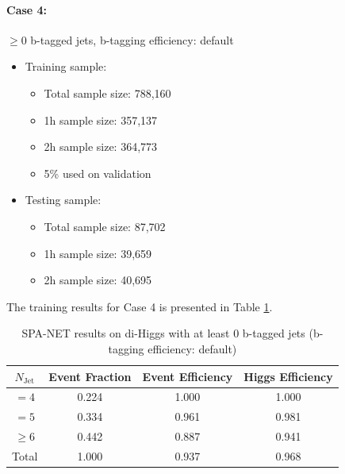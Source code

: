 \documentclass[12pt]{article}
\begin{document}
		\paragraph{Case 4:}$\ge 0$ b-tagged jets, b-tagging efficiency: default 
		\begin{itemize}
			\item Training sample:
			\begin{itemize}
				\item Total sample size: 788,160
				\item 1h sample size: 357,137
				\item 2h sample size: 364,773
				\item 5\% used on validation
			\end{itemize}
			\item Testing sample: 
				\begin{itemize}
					\item Total sample size: 87,702
					\item 1h sample size: 39,659
					\item 2h sample size: 40,695
				\end{itemize}
		\end{itemize}
		The training results for Case 4 is presented in Table \ref{tab:SPANet_0btag_default}.
		\begin{table}[htpb]
			\centering
			\caption{SPA-NET results on di-Higgs with at least 0 b-tagged jets (b-tagging efficiency: default)}
			\label{tab:SPANet_0btag_default}
			\begin{tabular}{c|c|cc}
				$N_\text{Jet}$ & Event Fraction & Event Efficiency & Higgs Efficiency \\
				\hline
				$=4$	  &   0.224             &     1.000             &  1.000        \\
				$=5$	  &   0.334             &     0.961             &  0.981        \\
				$\ge 6$	  &   0.442             &     0.887             &  0.941        \\
				Total	  &   1.000             &     0.937             &  0.968        \\
			\end{tabular}
		\end{table}
\end{document}
